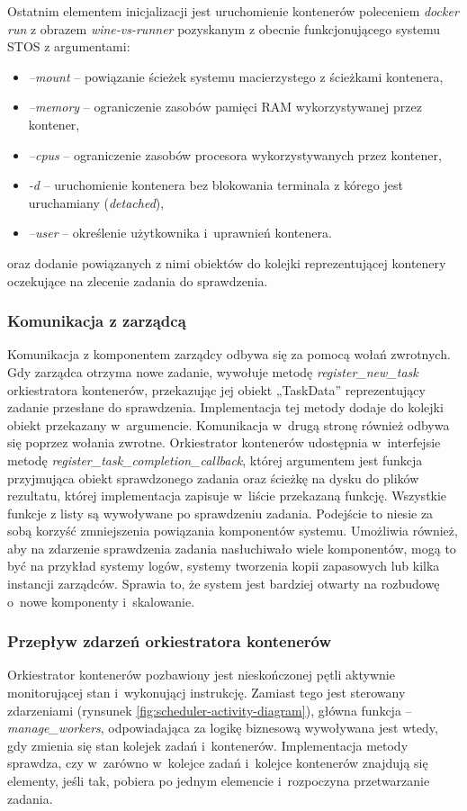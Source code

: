 Ostatnim elementem inicjalizacji jest uruchomienie kontenerów poleceniem \textit{docker run} z obrazem \textit{wine-vs-runner} pozyskanym z obecnie funkcjonującego systemu STOS z argumentami:
\begin{itemize}
    \item \textit{--mount} -- powiązanie ścieżek systemu macierzystego z ścieżkami kontenera,
    \item \textit{--memory} -- ograniczenie zasobów pamięci RAM wykorzystywanej przez kontener,
    \item \textit{--cpus} -- ograniczenie zasobów procesora wykorzystywanych przez kontener,
    \item \textit{-d} -- uruchomienie kontenera bez blokowania terminala z kórego jest uruchamiany (\textit{detached}),
    \item \textit{--user} -- określenie użytkownika i~uprawnień kontenera.
\end{itemize}
oraz dodanie powiązanych z nimi obiektów do kolejki reprezentującej kontenery oczekujące na zlecenie zadania do sprawdzenia.

\subsubsection{Komunikacja z zarządcą}
Komunikacja z komponentem zarządcy odbywa się za pomocą wołań zwrotnych. Gdy zarządca otrzyma nowe zadanie, wywołuje metodę \textit{register\_new\_task} orkiestratora kontenerów, przekazując jej obiekt „TaskData” reprezentujący zadanie przesłane do sprawdzenia. Implementacja tej metody dodaje do kolejki obiekt przekazany w~argumencie. Komunikacja w~drugą stronę również odbywa się poprzez wołania zwrotne. Orkiestrator kontenerów udostępnia w~interfejsie metodę \textit{register\_task\_completion\_callback}, której argumentem jest funkcja przyjmująca obiekt sprawdzonego zadania oraz ścieżkę na dysku do plików rezultatu, której implementacja zapisuje w~liście przekazaną funkcję. Wszystkie funkcje z listy są wywoływane po sprawdzeniu zadania. Podejście to niesie za sobą korzyść zmniejszenia powiązania komponentów systemu. Umożliwia również, aby na zdarzenie sprawdzenia zadania nasłuchiwało wiele komponentów, mogą to być na przykład systemy logów, systemy tworzenia kopii zapasowych lub kilka instancji zarządców. Sprawia to, że system jest bardziej otwarty na rozbudowę o~nowe komponenty i~skalowanie.

\subsubsection{Przepływ zdarzeń orkiestratora kontenerów}
Orkiestrator kontenerów pozbawiony jest nieskończonej pętli aktywnie monitorującej stan i~wykonującj instrukcję. Zamiast tego jest sterowany zdarzeniami (rynsunek \ref{fig:scheduler-activity-diagram}), główna funkcja -- \textit{manage\_workers}, odpowiadająca za logikę biznesową wywoływana jest wtedy, gdy zmienia się stan kolejek zadań i~kontenerów. Implementacja metody sprawdza, czy w~zarówno w~kolejce zadań i~kolejce kontenerów znajdują się elementy, jeśli tak, pobiera po jednym elemencie i~rozpoczyna przetwarzanie zadania.

